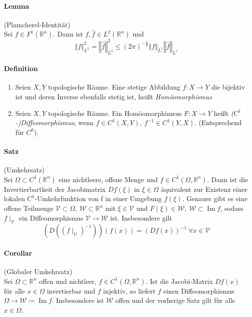 \documentclass[12pt,a4paper,fleqn]{article}
\DeclareMathOperator{\im}{Im}
\def\norm#1{{\left\Vert #1 \right\Vert}}
\def\R{{\mathbb{R}}}
\begin{document}
\paragraph{Lemma} (Plamcherel-Identität)\\
Sei $f \in F^1(\R^n)$. Dann ist $f, \widehat{f} \in L^2(\R^n)$ und 
\begin{displaymath}
\norm{f}^2_{L^2} = \norm{\widehat{f}}^2_{L^2} \leq (2\pi)^{-\frac{n}{2}} \norm{f}_{L^1} \norm{\widehat{f}}_{L^1}
\end{displaymath}

\paragraph{Definition}
\begin{enumerate}
\item Seien $X, Y$ topologische Räume. Eine stetige Abbildung $f\colon X \rightarrow Y$ die bijektiv ist und deren Inverse ebenfalls stetig ist, heißt \textit{Homöomorphismus}
\item Seien $X, Y$ topologische Räume. Ein Homöomorphimsus $F\colon X \rightarrow Y$ heißt \textit{($C^1$-)Diffeomorphismus}, wenn $f \in C^1(X, Y),\ f^{-1} \in C^1(Y, X)$. (Entsprechend für $C^k$).
\end{enumerate}

\paragraph{Satz} (Umkehrsatz)\\
Sei $\Omega \subset C^1(\R^n)$ eine nichtleere, offene Menge und $f \in C^1(\Omega, \R^n)$. Dann ist die Invertierbartkeit der Jacobimatrix $Df(\xi)$ in $\xi \in \Omega$ äquivalent zur Existenz einer lokalen $C^1$-Umkehrfunktion von f in einer Umgebung $f(\xi)$. Genauer gibt es eine offene Teilmenge $\mathcal{V} \subset \Omega,\ \mathcal{W} \subset \R^n$ mit $\xi \in \mathcal{V}$ und $F(\xi) \in \mathcal{W},\ \mathcal{W} \subset \im f$, sodass $f\mid_\mathcal{V}$ ein Diffeomorphismus $\mathcal{V} \rightarrow \mathcal{W}$ ist. Insbesondere gilt
\begin{displaymath}
(D((f\mid_\mathcal{V})^{-1}))(f(x)) = (Df(x))^{-1}\ \forall x \in \mathcal{V}
\end{displaymath}

\paragraph{Corollar} (Globaler Umkehrsatz)\\
Sei $\Omega \subset \R^n$ offen und nichtleer, $f \in C^1 (\Omega, \R^n)$. Ist die Jacobi-Matrix $Df(x)$ für alle $x \in \Omega$ invertierbar und $f$ injektiv, so liefert $f$ einen Diffeomorphismus $\Omega \rightarrow \mathcal{W} \coloneqq \im f$. Insbesondere ist $\mathcal{W}$ offen und der vorherige Satz gilt für alle $x \in \Omega$.
\end{document}
